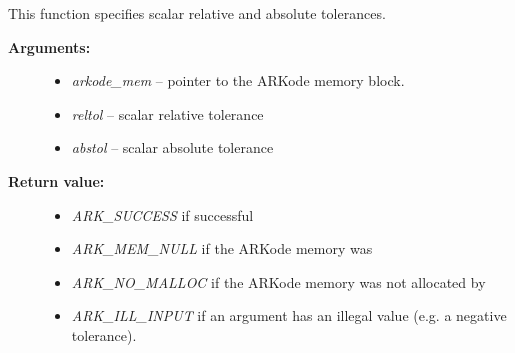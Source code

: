\documentclass[letterpaper,10pt,english]{sphinxmanual}
\begin{document}
\begin{fulllineitems}
\label{c_interface/User_callable:c.ARKodeSStolerances}
This function specifies scalar relative and absolute tolerances.
\begin{description}
\item[{\textbf{Arguments:}}] \leavevmode\begin{itemize}
\item {} 
\emph{arkode\_mem} -- pointer to the ARKode memory block.

\item {} 
\emph{reltol} -- scalar relative tolerance

\item {} 
\emph{abstol} -- scalar absolute tolerance

\end{itemize}

\item[{\textbf{Return value:}}] \leavevmode\begin{itemize}
\item {} 
\emph{ARK\_SUCCESS} if successful

\item {} 
\emph{ARK\_MEM\_NULL}  if the ARKode memory was 

\item {} 
\emph{ARK\_NO\_MALLOC}  if the ARKode memory was not allocated by {\hyperref[c_interface/User_callable:c.ARKodeInit]{\emph{}}}

\item {} 
\emph{ARK\_ILL\_INPUT} if an argument has an illegal value (e.g. a negative tolerance).

\end{itemize}

\end{description}

\end{fulllineitems}

\end{document}
